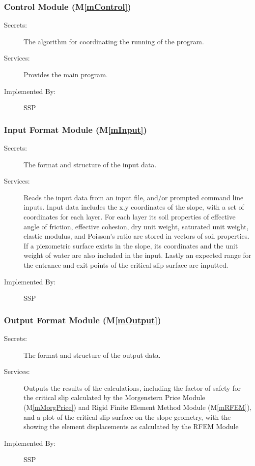 \documentclass[12pt]{article}
\newcommand{\progname}{SSP}
\newcommand{\mref}[1]{M\ref{#1}}
\begin{document}
\subsubsection{Control Module (\mref{mControl})}

\begin{description}
\item[Secrets:] The algorithm for coordinating the running of the
  program.
\item[Services:] Provides the main program.
\item[Implemented By:] \progname
\end{description}


\subsubsection{Input Format Module (\mref{mInput})}

\begin{description}
\item[Secrets:]The format and structure of the input data.
\item[Services:] Reads the input data from an input file, and/or
  prompted command line inputs. Input data includes the x,y
  coordinates of the slope, with a set of coordinates for each
  layer. For each layer its soil properties of effective angle of
  friction, effective cohesion, dry unit weight, saturated unit
  weight, elastic modulus, and Poisson's ratio are stored in vectors
  of soil properties. If a piezometric surface exists in the slope,
  its coordinates and the unit weight of water are also included in
  the input. Lastly an expected range for the entrance and exit points
  of the critical slip surface are inputted.
\item[Implemented By:] \progname
\end{description}

\subsubsection{Output Format Module (\mref{mOutput})}

\begin{description}
\item[Secrets:] The format and structure of the output data.
\item[Services:] Outputs the results of the calculations, including
  the factor of safety for the critical slip calculated by the
  Morgenstern Price Module (\mref{mMorgPrice}) and Rigid Finite
  Element Method Module (\mref{mRFEM}), and a plot of the critical
  slip surface on the slope geometry, with the showing the element
  displacements as calculated by the RFEM Module
\item[Implemented By:] \progname
\end{description} 
\end{document}
